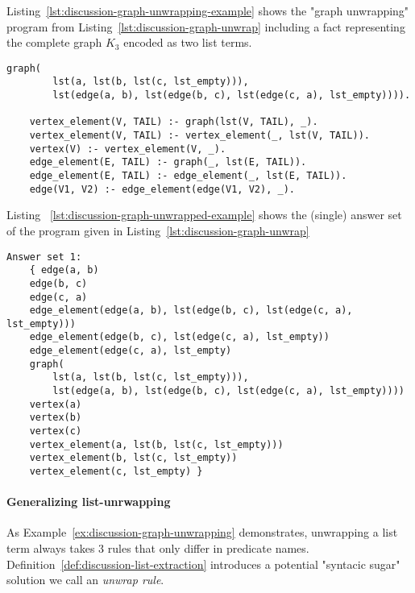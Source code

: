 \begin{example}
\label{ex:discussion-graph-unwrapping} 
Listing~\ref{lst:discussion-graph-unwrapping-example} shows the "graph unwrapping" program from Listing~\ref{lst:discussion-graph-unwrap} including a fact representing the complete graph $K_3$ encoded as two list terms.
\begin{lstlisting}[style=asp-code, label={lst:discussion-graph-unwrap}, caption={Unwrapping the list representation of $K_3$.}]
	graph(
		lst(a, lst(b, lst(c, lst_empty))),
		lst(edge(a, b), lst(edge(b, c), lst(edge(c, a), lst_empty)))).
	
	vertex_element(V, TAIL) :- graph(lst(V, TAIL), _).
	vertex_element(V, TAIL) :- vertex_element(_, lst(V, TAIL)).
	vertex(V) :- vertex_element(V, _).
	edge_element(E, TAIL) :- graph(_, lst(E, TAIL)).
	edge_element(E, TAIL) :- edge_element(_, lst(E, TAIL)).
	edge(V1, V2) :- edge_element(edge(V1, V2), _).
\end{lstlisting}
Listing ~\ref{lst:discussion-graph-unwrapped-example} shows the (single) answer set of the program given in Listing~\ref{lst:discussion-graph-unwrap}
\begin{lstlisting}[style=asp-code, label={lst:discussion-graph-unwrapped-example}, caption={The unwrapped list representation of $K_3$.}]
Answer set 1:
	{ edge(a, b)
	edge(b, c)
	edge(c, a)
	edge_element(edge(a, b), lst(edge(b, c), lst(edge(c, a), lst_empty)))
	edge_element(edge(b, c), lst(edge(c, a), lst_empty))
	edge_element(edge(c, a), lst_empty)
	graph(
		lst(a, lst(b, lst(c, lst_empty))), 
		lst(edge(a, b), lst(edge(b, c), lst(edge(c, a), lst_empty))))
	vertex(a)
	vertex(b)
	vertex(c)
	vertex_element(a, lst(b, lst(c, lst_empty)))
	vertex_element(b, lst(c, lst_empty))
	vertex_element(c, lst_empty) }
\end{lstlisting}
\end{example}    

\paragraph{Generalizing list-unrwapping}
As Example~\ref{ex:discussion-graph-unwrapping} demonstrates, unwrapping a list term always takes 3 rules that only differ in predicate names. Definition~\ref{def:discussion-list-extraction} introduces a potential "syntacic sugar" solution we call an \emph{unwrap rule}.

